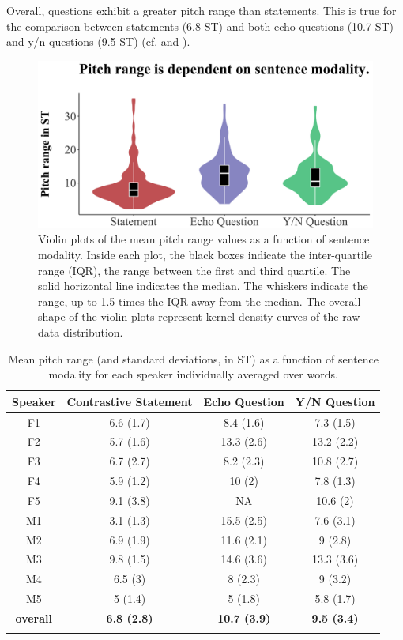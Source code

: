 Overall, questions exhibit a greater pitch range than statements. This is true for the comparison between statements (6.8 ST) and both echo questions (10.7 ST) and y/n questions (9.5 ST) (cf.  and ). 

  \begin{figure}
  \centering 
   \includegraphics[width=1\textwidth]{figures/Figure_5_6.png}
  \caption{Violin plots of the mean pitch range values as a function of sentence modality. Inside each plot, the black boxes indicate the inter-quartile range (IQR), the range between the first and third quartile. The solid horizontal line indicates the median. The whiskers indicate the range, up to 1.5 times the IQR away from the median. The overall shape of the violin plots represent kernel density curves of the raw data distribution.}
   \label{fig:5.6}
   \end{figure}

\begin{table}
  \begin{tabular}{cccc}
    \lsptoprule
\textbf{Speaker} & \textbf{Contrastive Statement} & \textbf{Echo Question} & \textbf{Y/N Question} \\
    \midrule
F1 & 6.6 (1.7) & 8.4 (1.6) & 7.3 (1.5)\\
F2 & 5.7 (1.6) & 13.3 (2.6) & 13.2 (2.2)\\
F3 & 6.7 (2.7) & 8.2 (2.3) & 10.8 (2.7)\\
F4 & 5.9 (1.2) & 10 (2) & 7.8 (1.3)\\
F5 & 9.1 (3.8) & NA & 10.6 (2)\\
M1 & 3.1 (1.3) & 15.5 (2.5) & 7.6 (3.1)\\
M2 & 6.9 (1.9) & 11.6 (2.1) & 9 (2.8)\\
M3 & 9.8 (1.5) & 14.6 (3.6) & 13.3 (3.6)\\
M4 & 6.5 (3) & 8 (2.3) & 9 (3.2)\\
M5 & 5 (1.4) & 5 (1.8) & 5.8 (1.7)\\
\midrule
\textbf{overall} & \textbf{6.8 (2.8)} & \textbf{10.7 (3.9)} & \textbf{9.5 (3.4)}\\
\lspbottomrule
  \end{tabular}
  \caption{Mean pitch range (and standard deviations, in ST) as a function of sentence modality for each speaker individually averaged over words.}
  \label{tab:5.3}
\end{table}

